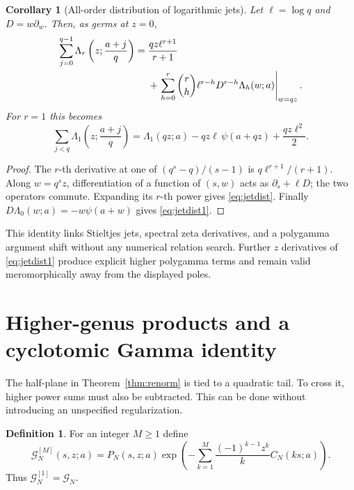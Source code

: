 \documentclass[11pt]{article}
\numberwithin{equation}{section}
\newtheorem{corollary}[theorem]{Corollary}
\theoremstyle{definition}\newtheorem{definition}[theorem]{Definition}
\theoremstyle{remark}\newtheorem{remark}[theorem]{Remark}
\newcommand{\G}{\mathcal G}\newcommand{\F}{\mathfrak F}
\begin{document}
\begin{corollary}[All-order distribution of logarithmic jets]
\label{cor:jetdist}
Let $\ell=\log q$ and $D=w\partial_w$. Then, as germs at $z=0$,
\begin{align}
 \sum_{j=0}^{q-1}\Lambda_r\left(z;\frac{a+j}{q}\right)
 ={}&\frac{qz\ell^{r+1}}{r+1}\notag\\
 &+\left.\sum_{h=0}^r\binom rh\ell^{r-h}
              D^{r-h}\Lambda_h(w;a)\right|_{w=qz}.
 \label{eq:jetdist}
\end{align}
For $r=1$ this becomes
\begin{equation}
 \sum_{j<q}\Lambda_1\left(z;\frac{a+j}{q}\right)
 =\Lambda_1(qz;a)-qz\ell\,\psi(a+qz)+\frac{qz\ell^2}{2}.
 \label{eq:jetdist1}
\end{equation}
\end{corollary}
\begin{proof}
The $r$-th derivative at one of $(q^s-q)/(s-1)$ is
$q\ell^{r+1}/(r+1)$. Along $w=q^sz$, differentiation of a function of
$(s,w)$ acts as $\partial_s+\ell D$; the two operators commute.
Expanding its $r$-th power gives \eqref{eq:jetdist}. Finally
$D\Lambda_0(w;a)=-w\psi(a+w)$ gives \eqref{eq:jetdist1}.
\end{proof}
This identity links Stieltjes jets, spectral zeta derivatives, and a
polygamma argument shift without any numerical relation search. Further
$z$ derivatives of \eqref{eq:jetdist1} produce explicit higher polygamma
terms and remain valid meromorphically away from the displayed poles.

\section{Higher-genus products and a cyclotomic Gamma identity}
\label{sec:cyclotomic}
The half-plane in Theorem~\ref{thm:renorm} is tied to a quadratic tail. To
cross it, higher power sums must also be subtracted. This can be done
without introducing an unspecified regularization.

\begin{definition}
For an integer $M\ge1$ define
\begin{equation}
 \G_N^{[M]}(s,z;a)=P_N(s,z;a)
  \exp\left(-\sum_{k=1}^M\frac{(-1)^{k-1}z^k}{k}C_N(ks;a)\right).
 \label{eq:genuscutoff}
\end{equation}
Thus $\G_N^{[1]}=\G_N$.
\end{definition}
\end{document}
